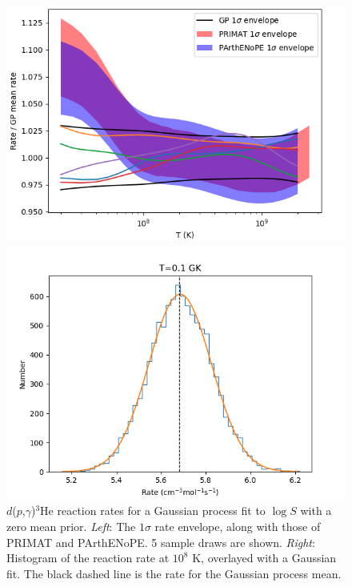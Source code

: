 \documentclass[%
 reprint,
superscriptaddress,
nofootinbib,
 amsmath,amssymb,
 aps,
 pra,
]{revtex4-2}
\begin{document}
\begin{figure}
	\centering
	\begin{minipage}{0.48\textwidth}
		\centering
		\includegraphics[width=\linewidth]{Figures/dphe3g_log_rate.png}
	\end{minipage}
	\hspace{0mm}
	\begin{minipage}{0.48\textwidth}
		\centering
		\includegraphics[width=\linewidth]{Figures/dphe3g_gaussian_rate.png}
	\end{minipage}
	\caption{$d$($p$,$\gamma$)$^3$He reaction rates for a Gaussian process fit to $\log S$ with a zero mean prior. \textit{Left}: The $1\sigma$ rate envelope, along with those of PRIMAT and PArthENoPE. 5 sample draws are shown. \textit{Right}: Histogram of the reaction rate at $10^8$ K, overlayed with a Gaussian fit. The black dashed line is the rate for the Gaussian process mean. }
\end{figure}
\end{document}
